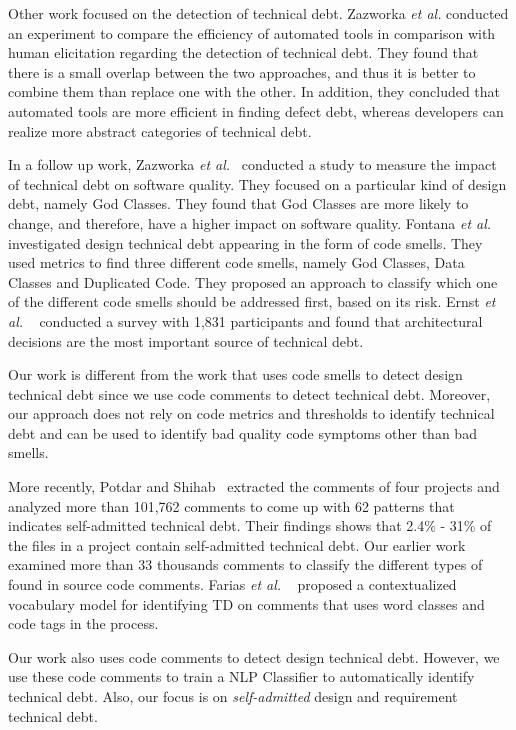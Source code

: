 Other work focused on the detection of technical debt. Zazworka \textit{et al.} \cite{Zazworka2013CSE} conducted an experiment to compare the efficiency of automated tools in comparison with human elicitation regarding the detection of technical debt. They found that there is a small overlap between the two approaches, and thus it is better to combine them than replace one with the other. In addition, they concluded that automated tools are more efficient in finding defect debt, whereas developers can realize more abstract categories of technical debt.

In a follow up work, Zazworka \textit{et al.}~\cite{Zazworka2011MTD} conducted a study to measure the impact of technical debt on software quality. They focused on a particular kind of design debt, namely God Classes. They found that God Classes are more likely to change, and therefore, have a higher impact on software quality. Fontana \textit{et al.}~\cite{Fontana2012MTD} investigated design technical debt appearing in the form of code smells. They used metrics to find three different code smells, namely God Classes, Data Classes and Duplicated Code. They proposed an approach to classify which one of the different code smells should be addressed first, based on its risk. Ernst \textit{et al.} ~\cite{Ernst2015FSE} conducted a survey with 1,831 participants and found that architectural decisions are the most important source of technical debt.

Our work is different from the work that uses code smells to detect design technical debt since we use code comments to detect technical debt. Moreover, our approach does not rely on code metrics and thresholds to identify technical debt and can be used to identify bad quality code symptoms other than bad smells.

More recently, Potdar and Shihab~\cite{Potdar2014ICSME} extracted the comments of four projects and analyzed more than 101,762 comments to come up with 62  patterns that indicates self-admitted technical debt. Their findings shows that 2.4\% - 31\% of the files in a project contain self-admitted technical debt. Our earlier work ~\cite{Maldonado2015MTD} examined more than 33 thousands comments to classify the different types of \SATD found in source code comments. Farias \textit{et al.} ~\cite{Farias2015MTD} proposed a contextualized vocabulary model for identifying TD on comments that uses word classes and code tags in the process. 

Our work also uses code comments to detect design technical debt. However, we use these code comments to train a NLP Classifier to automatically identify technical debt. Also, our focus is on \emph{self-admitted} design and requirement technical debt.

